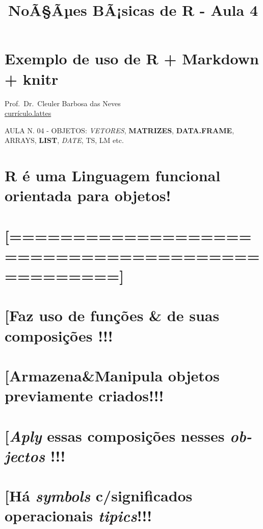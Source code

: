\documentclass[]{article}
\title{NoÃ§Ãµes BÃ¡sicas de R - Aula 4}
\author{}
\date{}
\begin{document}
\maketitle

\section{Exemplo de uso de R + Markdown +
knitr}\label{exemplo-de-uso-de-r-markdown-knitr}

Prof.~Dr.~Cleuler Barbosa das Neves\\
\href{http://buscatextual.cnpq.br/buscatextual/visualizacv.do?id=K4786159E2}{currículo.lattes}

AULA N. 04 - OBJETOS: \emph{VETORES}, \textbf{MATRIZES},
\textbf{DATA.FRAME}, ARRAYS, \textbf{LIST}, \emph{DATE}, TS, LM etc.

\section{\texorpdfstring{\textbf{R} é uma Linguagem \textbf{funcional}
orientada para
\textbf{objetos}!}{R é uma Linguagem funcional orientada para objetos!}}\label{r-e-uma-linguagem-funcional-orientada-para-objetos}

\section{{[}================================================{]}}\label{section}

\section{{[}Faz uso de funções \& de suas composições
!!!}\label{faz-uso-de-funcoes-de-suas-composicoes}

\section{{[}Armazena\&Manipula objetos previamente
criados!!!}\label{armazenamanipula-objetos-previamente-criados}

\section{\texorpdfstring{{[}\emph{Aply} essas composições nesses
\emph{ob-jectos}
!!!}{{[}Aply essas composições nesses ob-jectos !!!}}\label{aply-essas-composicoes-nesses-ob-jectos}

\section{\texorpdfstring{{[}Há \emph{symbols} c/significados
operacionais
\emph{tipics}!!!}{{[}Há symbols c/significados operacionais tipics!!!}}\label{ha-symbols-csignificados-operacionais-tipics}
\end{document}
